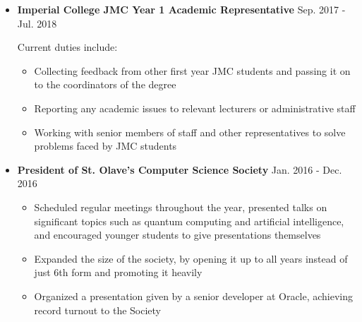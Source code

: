 \documentclass{moderncv}        %
\begin{document}
\begin{itemize}

\item \textbf{Imperial College JMC Year 1 Academic Representative} \hfill Sep. 2017 - Jul. 2018

\vspace{3pt}

Current duties include:

\vspace{3pt}

\begin{itemize}

\item Collecting feedback from other first year JMC students and passing it on to the coordinators of the degree

\vspace{3pt}

\item Reporting any academic issues to relevant lecturers or administrative staff

\vspace{3pt}

\item Working with senior members of staff and other representatives to solve problems faced by JMC students

\end{itemize}

\vspace{3pt}

\item \textbf{President of St. Olave’s Computer Science Society} \hfill Jan. 2016 - Dec. 2016

\vspace{3pt}

\begin{itemize}

\item Scheduled regular meetings throughout the year, presented talks on significant topics such as quantum computing and artificial intelligence, and encouraged younger students to give presentations themselves

\vspace{3pt}

\item Expanded the size of the society, by opening it up to all years instead of just 6th form and promoting it heavily

\vspace{3pt}

\item Organized a presentation given by a senior developer at Oracle, achieving record turnout to the Society


\end{itemize}
\end{itemize}
\end{document}
